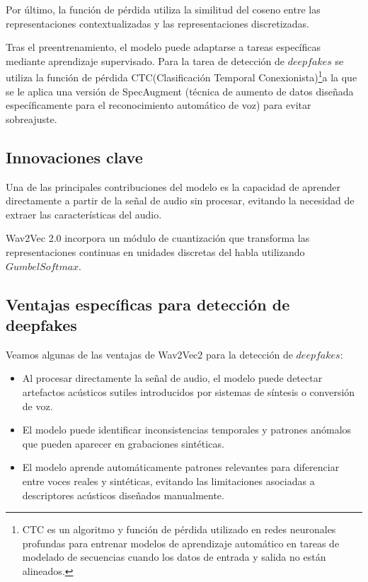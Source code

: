 Por último, la función de pérdida utiliza la similitud del coseno entre las representaciones contextualizadas y las representaciones discretizadas.

Tras el preentrenamiento, el modelo puede adaptarse a tareas específicas mediante aprendizaje supervisado. Para la tarea de detección de $deepfakes$ se utiliza la función de pérdida CTC(Clasificación Temporal Conexionista)\footnote{CTC es un algoritmo y función de pérdida utilizado en redes neuronales profundas para entrenar modelos de aprendizaje automático en tareas de modelado de secuencias cuando los datos de entrada y salida no están alineados.}a la que se le aplica una versión de SpecAugment (técnica de aumento de datos diseñada específicamente para el reconocimiento automático de voz) para evitar sobreajuste.

\subsection*{Innovaciones clave}

Una de las principales contribuciones del modelo es la capacidad de aprender directamente a partir de la señal de audio sin procesar, evitando la necesidad de extraer las características del audio.

Wav2Vec 2.0 incorpora un módulo de cuantización que transforma las representaciones continuas en unidades discretas del habla utilizando $Gumbel Softmax$.

\subsection*{Ventajas específicas para detección de deepfakes}

Veamos algunas de las ventajas de Wav2Vec2 para la detección de $deepfakes$:

\begin{itemize}
	\item Al procesar directamente la señal de audio, el modelo puede detectar artefactos acústicos sutiles introducidos por sistemas de síntesis o conversión de voz.
	\item El modelo puede identificar inconsistencias temporales y patrones anómalos que pueden aparecer en grabaciones sintéticas.
	\item El modelo aprende automáticamente patrones relevantes para diferenciar entre voces reales y sintéticas, evitando las limitaciones asociadas a descriptores acústicos diseñados manualmente.
\end{itemize}